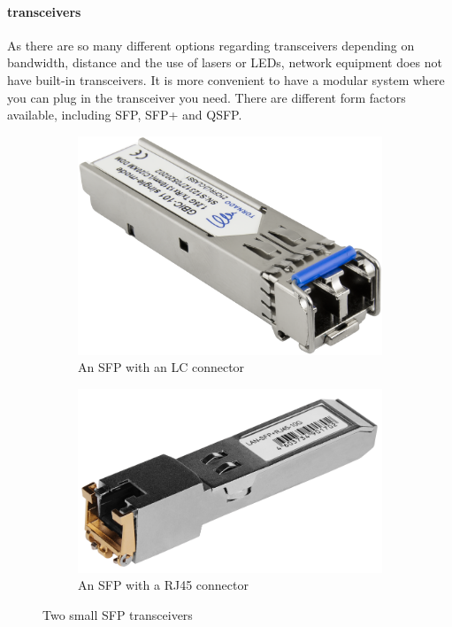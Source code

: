 \paragraph{transceivers}
As there are so many different options regarding transceivers depending on bandwidth, distance and the use of lasers or \acsp{LED}, network equipment does not have built-in transceivers.
It is more convenient to have a modular system where you can plug in the transceiver you need.
There are different form factors available, including \acs{SFP}, \acs{SFP+} and \acs{QSFP}.

\begin{figure}
   \begin{subfigure}[b]{0.45\textwidth}
   \centering
   \includegraphics[width=\textwidth]{images/physical/sfp.png}
   \caption{An \acs{SFP} with an \acs{LC} connector}
   \label{fig:sfp-lc}
   \end{subfigure}
   \hfill
   \begin{subfigure}[b]{0.45\textwidth}
   \centering
   \includegraphics[width=\textwidth]{images/physical/sfp-rj45.png}
   \caption{An \acs{SFP} with a \acs{RJ45} connector}
   \label{fig:sfp-rj45}
   \end{subfigure}
   \caption{Two small \acf{SFP} transceivers}
   \label{fig:sfp}
\end{figure}

